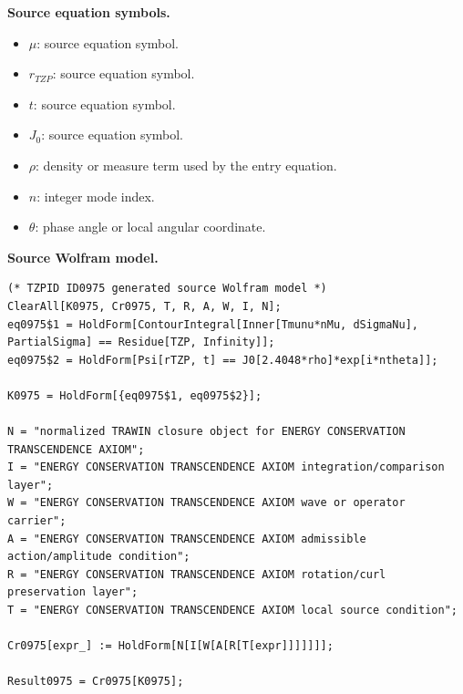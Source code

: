 \begin{minipage}[t]{0.49\linewidth}
\begingroup
\small
\raggedright
\textbf{Source equation symbols.}\par
\begin{itemize}[leftmargin=1.35em,itemsep=1pt,topsep=1pt,parsep=0pt]
    \item $\mu$: source equation symbol.
    \item $r_{TZP}$: source equation symbol.
    \item $t$: source equation symbol.
    \item $J_0$: source equation symbol.
    \item $\rho$: density or measure term used by the entry equation.
    \item $n$: integer mode index.
    \item $\theta$: phase angle or local angular coordinate.
\end{itemize}
\endgroup
\end{minipage}\hfill
\begin{minipage}[t]{0.47\linewidth}
\begingroup
\scriptsize
\raggedright
\textbf{Source Wolfram model.}\par
\begin{Verbatim}[fontsize=\tiny,breaklines=true,breakanywhere=true]
(* TZPID ID0975 generated source Wolfram model *)
ClearAll[K0975, Cr0975, T, R, A, W, I, N];
eq0975$1 = HoldForm[ContourIntegral[Inner[Tmunu*nMu, dSigmaNu], PartialSigma] == Residue[TZP, Infinity]];
eq0975$2 = HoldForm[Psi[rTZP, t] == J0[2.4048*rho]*exp[i*ntheta]];

K0975 = HoldForm[{eq0975$1, eq0975$2}];

N = "normalized TRAWIN closure object for ENERGY CONSERVATION TRANSCENDENCE AXIOM";
I = "ENERGY CONSERVATION TRANSCENDENCE AXIOM integration/comparison layer";
W = "ENERGY CONSERVATION TRANSCENDENCE AXIOM wave or operator carrier";
A = "ENERGY CONSERVATION TRANSCENDENCE AXIOM admissible action/amplitude condition";
R = "ENERGY CONSERVATION TRANSCENDENCE AXIOM rotation/curl preservation layer";
T = "ENERGY CONSERVATION TRANSCENDENCE AXIOM local source condition";

Cr0975[expr_] := HoldForm[N[I[W[A[R[T[expr]]]]]]];

Result0975 = Cr0975[K0975];
\end{Verbatim}
\endgroup
\end{minipage}


